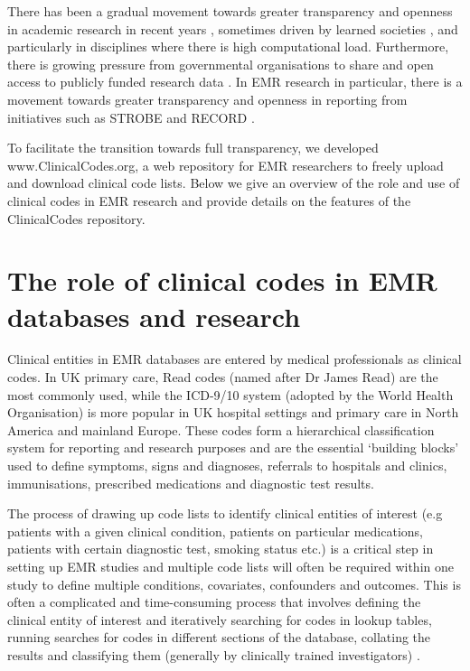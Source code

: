 \documentclass[10pt]{article}
\begin{document}
There has been a gradual movement towards greater transparency and openness in academic research in recent years \cite{Bechhofer2013, Stodden2013, Pampel2013}, sometimes driven by learned societies \cite{RoyalSoc2012}, and particularly in disciplines where there is high computational load. Furthermore, there is growing pressure from governmental organisations to share and open access to publicly funded research data \cite{EuropeanCommission2012, OfficeSciTech2013}. In EMR research in particular, there is a movement towards greater transparency and openness in reporting from initiatives such as STROBE \cite{vonElm2007} and RECORD \cite{Langan2013}.

To facilitate the transition towards full transparency, we developed www.ClinicalCodes.org, a web repository for EMR researchers to freely upload and download clinical code lists.  Below we give an overview of the role and use of clinical codes in EMR research and provide details on the features of the ClinicalCodes repository.


\section*{The role of clinical codes in EMR databases and research}


Clinical entities in EMR databases are entered by medical professionals as clinical codes.  In UK primary care, Read codes (named after Dr James Read) are the most commonly used, while the ICD-9/10 system (adopted by the World Health Organisation)  is more popular in UK hospital settings and primary care in North America and mainland Europe.  These codes form a hierarchical classification system for reporting and research purposes and are the essential `building blocks' used to define symptoms, signs and diagnoses, referrals to hospitals and clinics, immunisations, prescribed medications and diagnostic test results.

The process of drawing up code lists to identify clinical entities of interest (e.g patients with a given clinical condition, patients on particular medications, patients with certain diagnostic test, smoking status etc.) is a critical step in setting up EMR studies and multiple code lists will often be required within one study to define multiple conditions, covariates, confounders and outcomes.  This is often a complicated and time-consuming process that involves defining the clinical entity of interest and iteratively searching for codes in lookup tables, running searches for codes in different sections of the database, collating the results and classifying them (generally by clinically trained investigators) \cite{Dave2009, Nicholson2013}.  
\end{document}
